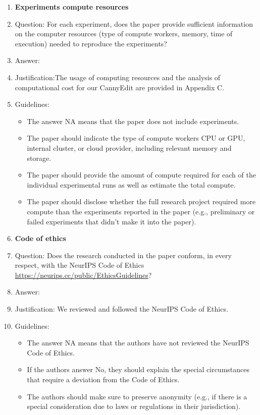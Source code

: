 \documentclass{article}
\begin{document}
\begin{enumerate}
\item {\bf Experiments compute resources}
    \item[] Question: For each experiment, does the paper provide sufficient information on the computer resources (type of compute workers, memory, time of execution) needed to reproduce the experiments?
    \item[] Answer: \answerYes{} %
    \item[] Justification:The usage of computing resources and the analysis of computational cost for our CannyEdit are provided in Appendix C.
    \item[] Guidelines:
    \begin{itemize}
        \item The answer NA means that the paper does not include experiments.
        \item The paper should indicate the type of compute workers CPU or GPU, internal cluster, or cloud provider, including relevant memory and storage.
        \item The paper should provide the amount of compute required for each of the individual experimental runs as well as estimate the total compute. 
        \item The paper should disclose whether the full research project required more compute than the experiments reported in the paper (e.g., preliminary or failed experiments that didn't make it into the paper). 
    \end{itemize}
    
\item {\bf Code of ethics}
    \item[] Question: Does the research conducted in the paper conform, in every respect, with the NeurIPS Code of Ethics \url{https://neurips.cc/public/EthicsGuidelines}?
    \item[] Answer: \answerYes{} %
    \item[] Justification: We reviewed and followed the NeurIPS Code of Ethics.
    \item[] Guidelines:
    \begin{itemize}
        \item The answer NA means that the authors have not reviewed the NeurIPS Code of Ethics.
        \item If the authors answer No, they should explain the special circumstances that require a deviation from the Code of Ethics.
        \item The authors should make sure to preserve anonymity (e.g., if there is a special consideration due to laws or regulations in their jurisdiction).
    \end{itemize}



\end{enumerate}
\end{document}
